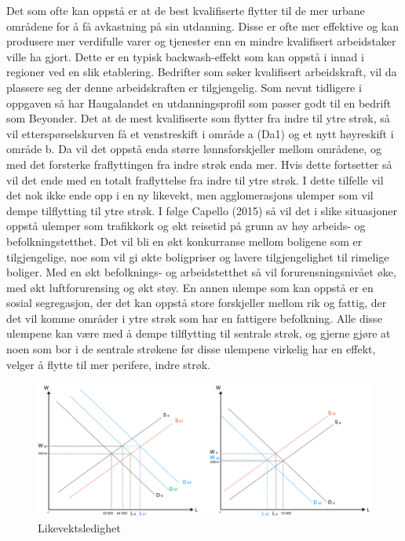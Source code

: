 \documentclass[
]{article}
\begin{document}
Det som ofte kan oppstå er at de best kvalifiserte flytter til de mer
urbane områdene for å få avkastning på sin utdanning. Disse er ofte mer
effektive og kan produsere mer verdifulle varer og tjenester enn en
mindre kvalifisert arbeidstaker ville ha gjort. Dette er en typisk
backwash-effekt som kan oppstå i innad i regioner ved en slik
etablering. Bedrifter som søker kvalifisert arbeidskraft, vil da
plassere seg der denne arbeidskraften er tilgjengelig. Som nevnt
tidligere i oppgaven så har Haugalandet en utdanningsprofil som passer
godt til en bedrift som Beyonder. Det at de mest kvalifiserte som
flytter fra indre til ytre strøk, så vil etterspørselskurven få et
venstreskift i område a (Da1) og et nytt høyreskift i område b. Da vil
det oppstå enda større lønnsforskjeller mellom områdene, og med det
forsterke fraflyttingen fra indre strøk enda mer. Hvis dette fortsetter
så vil det ende med en totalt fraflyttelse fra indre til ytre strøk. I
dette tilfelle vil det nok ikke ende opp i en ny likevekt, men
agglomerasjons ulemper som vil dempe tilflytting til ytre strøk. I følge
Capello (2015) så vil det i slike situasjoner oppstå ulemper som
trafikkork og økt reisetid på grunn av høy arbeids- og
befolkningstetthet. Det vil bli en økt konkurranse mellom boligene som
er tilgjengelige, noe som vil gi økte boligpriser og lavere
tilgjengelighet til rimelige boliger. Med en økt befolknings- og
arbeidstetthet så vil forurensningsnivået øke, med økt luftforurensing
og økt støy. En annen ulempe som kan oppstå er en sosial segregasjon,
der det kan oppstå store forskjeller mellom rik og fattig, der det vil
komme områder i ytre strøk som har en fattigere befolkning. Alle disse
ulempene kan være med å dempe tilflytting til sentrale strøk, og gjerne
gjøre at noen som bor i de sentrale strøkene før disse ulempene virkelig
har en effekt, velger å flytte til mer perifere, indre strøk.

\begin{figure}[H]

{\centering \includegraphics{bilder/likevektsledighet.png}

}

\caption{\label{fig-likevektslediget}Likevektsledighet}

\end{figure}
\end{document}
